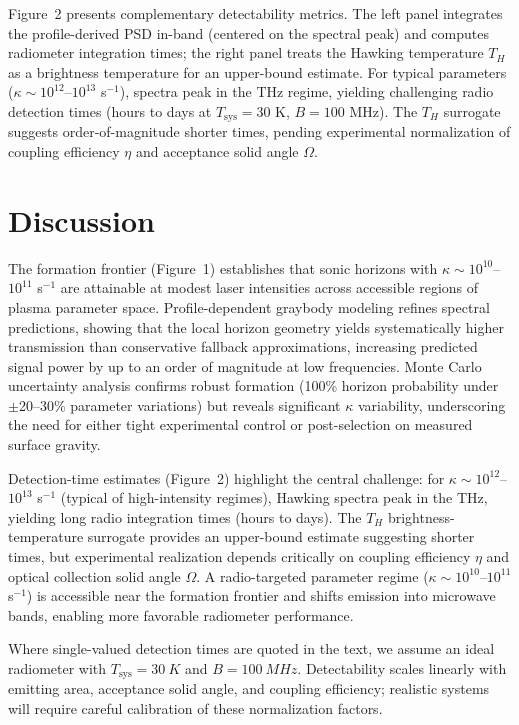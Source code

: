 \documentclass[11pt]{article}
\begin{document}
Figure~2 presents complementary detectability metrics. The left panel integrates the profile-derived PSD in-band (centered on the spectral peak) and computes radiometer integration times; the right panel treats the Hawking temperature $T_H$ as a brightness temperature for an upper-bound estimate. For typical parameters ($\kappa \sim 10^{12}$--$10^{13}$ s$^{-1}$), spectra peak in the THz regime, yielding challenging radio detection times (hours to days at $T_{\text{sys}} = 30$ K, $B = 100$ MHz). The $T_H$ surrogate suggests order-of-magnitude shorter times, pending experimental normalization of coupling efficiency $\eta$ and acceptance solid angle $\Omega$.

\section{Discussion}
The formation frontier (Figure~1) establishes that sonic horizons with $\kappa \sim 10^{10}$--$10^{11}$ s$^{-1}$ are attainable at modest laser intensities across accessible regions of plasma parameter space. Profile-dependent graybody modeling refines spectral predictions, showing that the local horizon geometry yields systematically higher transmission than conservative fallback approximations, increasing predicted signal power by up to an order of magnitude at low frequencies. Monte Carlo uncertainty analysis confirms robust formation (100\% horizon probability under $\pm$20--30\% parameter variations) but reveals significant $\kappa$ variability, underscoring the need for either tight experimental control or post-selection on measured surface gravity.

Detection-time estimates (Figure~2) highlight the central challenge: for $\kappa \sim 10^{12}$--$10^{13}$ s$^{-1}$ (typical of high-intensity regimes), Hawking spectra peak in the THz, yielding long radio integration times (hours to days). The $T_H$ brightness-temperature surrogate provides an upper-bound estimate suggesting shorter times, but experimental realization depends critically on coupling efficiency $\eta$ and optical collection solid angle $\Omega$. A radio-targeted parameter regime ($\kappa \sim 10^{10}$--$10^{11}$ s$^{-1}$) is accessible near the formation frontier and shifts emission into microwave bands, enabling more favorable radiometer performance.

Where single-valued detection times are quoted in the text, we assume an ideal radiometer with $T_{\mathrm{sys}}=\SI{30}{K}$ and $B=\SI{100}{MHz}$. Detectability scales linearly with emitting area, acceptance solid angle, and coupling efficiency; realistic systems will require careful calibration of these normalization factors.
\end{document}
